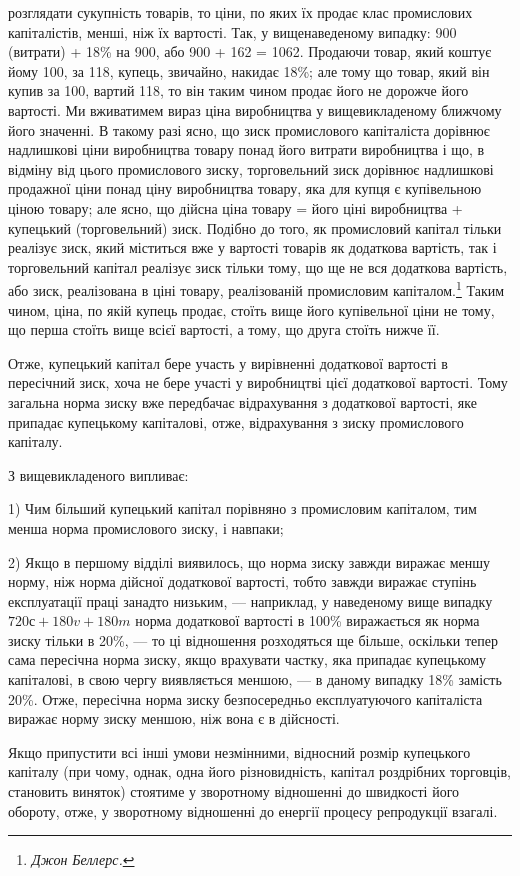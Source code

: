 \parcont{}  %
розглядати сукупність товарів, то ціни, по яких їх продає клас
промислових капіталістів, менші, ніж їх вартості. Так, у вищенаведеному випадку: 900 (витрати) + 18\%
на 900, або 900 + 162 =
1062. Продаючи товар, який коштує йому 100, за 118, купець, звичайно,
накидає 18\%; але тому що товар, який він купив за 100,
вартий 118, то він таким чином продає його не дорожче його
вартості. Ми вживатимем вираз ціна виробництва у вищевикладеному
ближчому його значенні. В такому разі ясно, що зиск
промислового капіталіста дорівнює надлишкові ціни виробництва
товару понад його витрати виробництва і що, в відміну від цього
промислового зиску, торговельний зиск дорівнює надлишкові
продажної ціни понад ціну виробництва товару, яка для купця
є купівельною ціною товару; але ясно, що дійсна ціна товару =
його ціні виробництва + купецький (торговельний) зиск. Подібно
до того, як промисловий капітал тільки реалізує зиск, який міститься
вже у вартості товарів як додаткова вартість, так і торговельний
капітал реалізує зиск тільки тому, що ще не вся
додаткова вартість, або зиск, реалізована в ціні товару, реалізованій
промисловим капіталом.\footnote{
\emph{Джон Беллерс.}
} Таким чином, ціна, по якій купець
продає, стоїть вище його купівельної ціни не тому, що
перша стоїть вище всієї вартості, а тому, що друга стоїть нижче її.

Отже, купецький капітал бере участь у вирівненні додаткової
вартості в пересічний зиск, хоча не бере участі у виробництві
цієї додаткової вартості. Тому загальна норма зиску вже
передбачає відрахування з додаткової вартості, яке припадає купецькому
капіталові, отже, відрахування з зиску промислового
капіталу.

З вищевикладеного випливає:

1) Чим більший купецький капітал порівняно з промисловим
капіталом, тим менша норма промислового зиску, і навпаки;

2) Якщо в першому відділі виявилось, що норма зиску завжди
виражає меншу норму, ніж норма дійсної додаткової вартості,
тобто завжди виражає ступінь експлуатації праці занадто низьким,
— наприклад, у наведеному вище випадку $720 с + 180 v + 180 m$
норма додаткової вартості в 100\% виражається як норма зиску
тільки в 20\%, — то ці відношення розходяться ще більше,
оскільки тепер сама пересічна норма зиску, якщо врахувати
частку, яка припадає купецькому капіталові, в свою чергу виявляється
меншою, — в даному випадку 18\% замість 20\%. Отже,
пересічна норма зиску безпосередньо експлуатуючого капіталіста
виражає норму зиску меншою, ніж вона є в дійсності.

Якщо припустити всі інші умови незмінними, відносний розмір
купецького капіталу (при чому, однак, одна його різновидність,
капітал роздрібних торговців, становить виняток) стоятиме
у зворотному відношенні до швидкості його обороту, отже,
у зворотному відношенні до енергії процесу репродукції взагалі.
\parbreak{}  %
